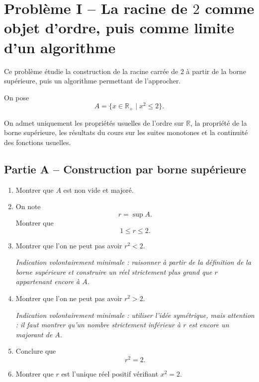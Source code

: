 \documentclass[11pt,a4paper]{article}
\newcommand{\R}{\mathbb{R}}
\begin{document}
\newpage


\section*{Problème I -- La racine de \(2\) comme objet d'ordre, puis comme limite d'un algorithme}

Ce problème étudie la construction de la racine carrée de \(2\) à partir de la borne supérieure, puis un algorithme permettant de l'approcher.

On pose
\[
A=\{x\in \R_+ \mid x^2\leq 2\}.
\]

On admet uniquement les propriétés usuelles de l'ordre sur \(\R\), la propriété de la borne supérieure, les résultats du cours sur les suites monotones et la continuité des fonctions usuelles.


\subsection*{Partie A -- Construction par borne supérieure}

\begin{enumerate}
    \item Montrer que \(A\) est non vide et majoré.

    \item On note
    \[
    r=\sup A.
    \]
    Montrer que
    \[
    1\leq r\leq 2.
    \]

    \item Montrer que l'on ne peut pas avoir \(r^2<2\).

    \medskip

    \emph{Indication volontairement minimale : raisonner à partir de la définition de la borne supérieure et construire un réel strictement plus grand que \(r\) appartenant encore à \(A\).}

    \item Montrer que l'on ne peut pas avoir \(r^2>2\).

    \medskip

    \emph{Indication volontairement minimale : utiliser l'idée symétrique, mais attention : il faut montrer qu'un nombre strictement inférieur à \(r\) est encore un majorant de \(A\).}

    \item Conclure que
    \[
    r^2=2.
    \]

    \item Montrer que \(r\) est l'unique réel positif vérifiant \(x^2=2\).
\end{enumerate}
\end{document}
